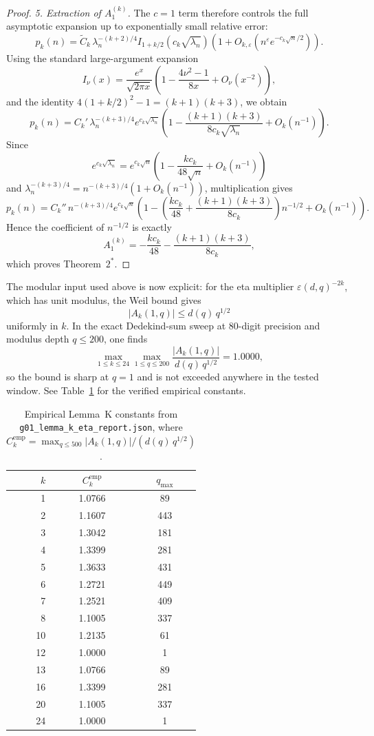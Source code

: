 \documentclass[11pt,a4paper]{article}
\begin{document}
\begin{proof}
\smallskip
\noindent\emph{5. Extraction of $A_1^{(k)}$.}
The $c=1$ term therefore controls the full asymptotic expansion up to exponentially small relative error:
\[
  p_k(n)
  = \widetilde C_k\,\lambda_n^{-(k+2)/4} I_{1+k/2}(c_k\sqrt{\lambda_n})
    \left(1+O_{k,\varepsilon}\!\left(n^{\varepsilon}e^{-c_k\sqrt n/2}\right)\right).
\]
Using the standard large-argument expansion
\[
  I_\nu(x)=\frac{e^x}{\sqrt{2\pi x}}
  \left(1-\frac{4\nu^2-1}{8x}+O_\nu(x^{-2})\right),
\]
and the identity $4(1+k/2)^2-1=(k+1)(k+3)$, we obtain
\[
  p_k(n)
  = C_k'\,\lambda_n^{-(k+3)/4}e^{c_k\sqrt{\lambda_n}}
    \left(1-\frac{(k+1)(k+3)}{8c_k\sqrt{\lambda_n}}+O_k(n^{-1})\right).
\]
Since
\[
  e^{c_k\sqrt{\lambda_n}}
  = e^{c_k\sqrt n}\left(1-\frac{k c_k}{48\sqrt n}+O_k(n^{-1})\right)
\]
and $\lambda_n^{-(k+3)/4}=n^{-(k+3)/4}(1+O_k(n^{-1}))$, multiplication gives
\[
  p_k(n)=C_k''\,n^{-(k+3)/4}e^{c_k\sqrt n}
  \left(1-
    \left(\frac{k c_k}{48}+\frac{(k+1)(k+3)}{8c_k}\right)n^{-1/2}
    + O_k(n^{-1})
  \right).
\]
Hence the coefficient of $n^{-1/2}$ is exactly
\[
  A_1^{(k)} = -\frac{k c_k}{48} - \frac{(k+1)(k+3)}{8c_k},
\]
which proves Theorem~$2^*$.
\end{proof}

The modular input used above is now explicit: for the eta multiplier $\varepsilon(d,q)^{-2k}$, which has unit modulus, the Weil bound gives
\[
  |A_k(1,q)| \le d(q)\,q^{1/2}
\]
uniformly in $k$. In the exact Dedekind-sum sweep at 80-digit precision and modulus depth $q\le 200$, one finds
\[
  \max_{1\le k\le 24}\max_{1\le q\le 200} \frac{|A_k(1,q)|}{d(q)\,q^{1/2}} = 1.0000,
\]
so the bound is sharp at $q=1$ and is not exceeded anywhere in the tested window. See Table~\ref{tab:lemmaK} for the verified empirical constants.

\begin{table}[t]
\centering
\caption{Empirical Lemma~K constants from \texttt{g01\_lemma\_k\_eta\_report.json}, where $C_k^{\mathrm{emp}} = \max_{q\le 500} |A_k(1,q)|/(d(q)\,q^{1/2})$.}
\label{tab:lemmaK}
\begin{tabular}{rcc}
\toprule
$k$ & $C_k^{\mathrm{emp}}$ & $q_{\max}$ \\
\midrule
1  & 1.0766 & 89  \\
2  & 1.1607 & 443 \\
3  & 1.3042 & 181 \\
4  & 1.3399 & 281 \\
5  & 1.3633 & 431 \\
6  & 1.2721 & 449 \\
7  & 1.2521 & 409 \\
8  & 1.1005 & 337 \\
10 & 1.2135 & 61  \\
12 & 1.0000 & 1   \\
13 & 1.0766 & 89  \\
16 & 1.3399 & 281 \\
20 & 1.1005 & 337 \\
24 & 1.0000 & 1   \\
\bottomrule
\end{tabular}
\end{table}
\end{document}
